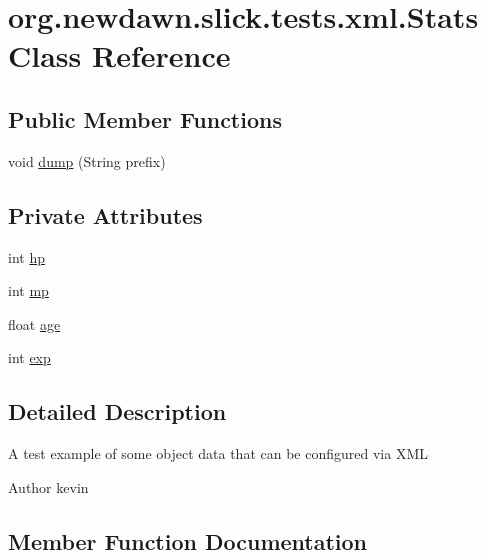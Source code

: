 \hypertarget{classorg_1_1newdawn_1_1slick_1_1tests_1_1xml_1_1_stats}{}\section{org.\+newdawn.\+slick.\+tests.\+xml.\+Stats Class Reference}
\label{classorg_1_1newdawn_1_1slick_1_1tests_1_1xml_1_1_stats}
\subsection*{Public Member Functions}
\begin{DoxyCompactItemize}
\item 
void \mbox{\hyperlink{classorg_1_1newdawn_1_1slick_1_1tests_1_1xml_1_1_stats_ad10fe6ffff96bbf3856ce5789a641683}{dump}} (String prefix)
\end{DoxyCompactItemize}
\subsection*{Private Attributes}
\begin{DoxyCompactItemize}
\item 
int \mbox{\hyperlink{classorg_1_1newdawn_1_1slick_1_1tests_1_1xml_1_1_stats_a9a971fc03aad54e0c28f9240b1acb054}{hp}}
\item 
int \mbox{\hyperlink{classorg_1_1newdawn_1_1slick_1_1tests_1_1xml_1_1_stats_ae63d4660593f09ce167a78ffd878a478}{mp}}
\item 
float \mbox{\hyperlink{classorg_1_1newdawn_1_1slick_1_1tests_1_1xml_1_1_stats_af7abb47cdc06bace5c39f14a90fb99f0}{age}}
\item 
int \mbox{\hyperlink{classorg_1_1newdawn_1_1slick_1_1tests_1_1xml_1_1_stats_abab0dd7cf87c1901da2f37e66e27868e}{exp}}
\end{DoxyCompactItemize}


\subsection{Detailed Description}
A test example of some object data that can be configured via X\+ML

\begin{DoxyAuthor}{Author}
kevin 
\end{DoxyAuthor}


\subsection{Member Function Documentation}
\mbox{\label{classorg_1_1newdawn_1_1slick_1_1tests_1_1xml_1_1_stats_ad10fe6ffff96bbf3856ce5789a641683}} 
